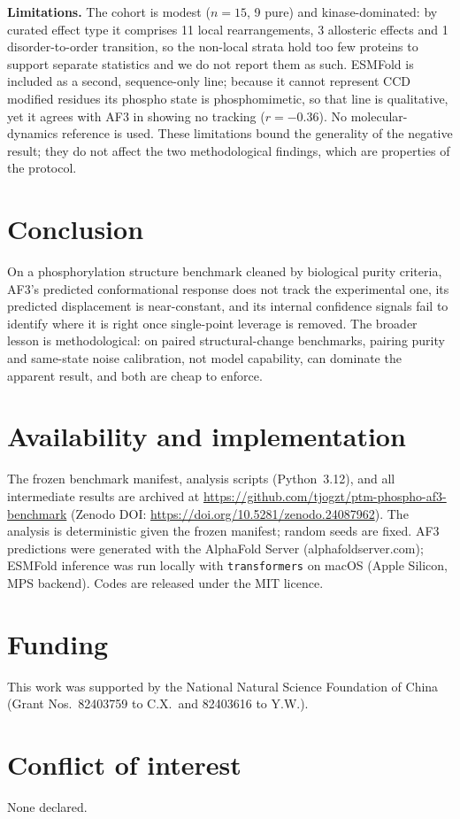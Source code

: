 \noindent\textbf{Limitations.} The cohort is modest ($n=15$, 9 pure) and
kinase-dominated: by curated effect type it comprises 11 local
rearrangements, 3 allosteric effects and 1 disorder-to-order transition, so
the non-local strata hold too few proteins to support separate statistics
and we do not report them as such. ESMFold is included as a second,
sequence-only line; because it cannot represent CCD modified residues its
phospho state is phosphomimetic, so that line is qualitative, yet it
agrees with AF3 in showing no tracking ($r=-0.36$).
No molecular-dynamics reference is used. These limitations bound the
generality of the negative result; they do not affect the two
methodological findings, which are properties of the protocol.

\section{Conclusion}
\label{sec:conclusion}

On a phosphorylation structure benchmark cleaned by biological purity
criteria, AF3's predicted conformational response does not track the
experimental one, its predicted displacement is near-constant, and its
internal confidence signals fail to identify where it is right once
single-point leverage is removed. The broader lesson is methodological: on
paired structural-change benchmarks, pairing purity and same-state noise
calibration, not model capability, can dominate the apparent result, and
both are cheap to enforce.

\section*{Availability and implementation}

The frozen benchmark manifest, analysis scripts (Python~3.12), and all
intermediate results are archived at
\url{https://github.com/tjogzt/ptm-phospho-af3-benchmark}
(Zenodo DOI: \url{https://doi.org/10.5281/zenodo.24087962}). The
analysis is deterministic given the frozen manifest; random seeds are
fixed. AF3 predictions were generated with the AlphaFold Server
(alphafoldserver.com); ESMFold inference was run locally with
\texttt{transformers} on macOS (Apple Silicon, MPS backend). Codes are
released under the MIT licence.

\section*{Funding}
This work was supported by the National Natural Science Foundation of
China (Grant Nos.\ 82403759 to C.X.\ and 82403616 to Y.W.).

\section*{Conflict of interest}
None declared.
